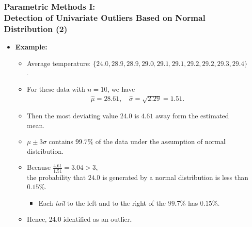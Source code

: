 \begin{frame}
  \frametitle{Parametric Methods I: \\ Detection of Univariate Outliers Based on Normal Distribution (2)}
  \begin{itemize}
  \item \textbf{Example:}
    \begin{itemize}
    \item Average temperature: $\{24.0, 28.9, 28.9, 29.0, 29.1, 29.1, 29.2, 29.2, 29.3, 29.4\}$.
    \item For these data with $n = 10$, we have
      \begin{align}
        \widehat{\mu}=28.61, \quad \widehat{\sigma}=\sqrt{2.29}=1.51.
      \end{align}
    \item Then the most deviating value $24.0$ is $4.61$ away form the estimated mean.
    \item $\mu \pm 3\sigma $ contains $99.7\%$ of the data under the assumption of normal distribution.
    \item Because $\frac{4.61}{1.51}  =  3.04  >  3$, \\
      the probability that $24.0$ is generated by a normal distribution is less than $0.15\%$.
      \begin{itemize}
      \item Each \emph{tail} to the left and to the right of the $99.7\%$ has $0.15\%$.
      \end{itemize}
    \item Hence, $24.0$ identified as an outlier.
    \end{itemize}
  \end{itemize}
\end{frame}


